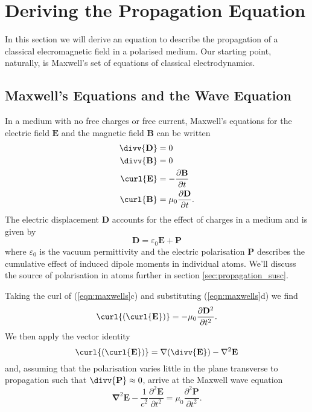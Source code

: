 \section{Deriving the Propagation Equation}
  \label{sec:propagation_deriving}

    In this section we will derive an equation to describe the propagation of a
    classical elecromagnetic field in a polarised medium. Our starting point,
    naturally, is Maxwell's set of equations of classical electrodynamics.

  \subsection{Maxwell's Equations and the Wave Equation}

    In a medium with no free charges or free current, Maxwell's equations for
    the electric field $\mathbf{E}$ and the magnetic field $\mathbf{B}$ can be
    written\cite{jackson1998classical}
    \begin{subequations}
      \begin{align}
        \divv{\mathbf{D}} &= 0 \\
        \divv{\mathbf{B}} &= 0 \\
        \curl{\mathbf{E}} &= -\frac{\partial \mathbf{B}}{\partial t} \\
        \curl{\mathbf{B}} &= \mu_0 \frac{\partial \mathbf{D}}{\partial t}.
      \end{align}
      \label{eqn:maxwells}
    \end{subequations}
    The electric displacement $\mathbf{D}$ accounts for the effect of charges in
    a medium and is given by 
    \begin{equation}\label{eqn:elec_displacement}
      \mathbf{D} = \varepsilon_0 \mathbf{E} + \mathbf{P}
    \end{equation}
    where $\varepsilon_0$ is the vacuum permittivity and the electric
    polarisation $\mathbf{P}$ describes the cumulative effect of induced dipole
    moments in individual atoms. We'll discuss the source of polarisation in
    atoms further in section \ref{sec:propagation_susc}.

    Taking the curl of (\ref{eqn:maxwells}c) and substituting 
    (\ref{eqn:maxwells}d) we find 
    $$
      \curl{(\curl{\mathbf{E}})} = 
      -\mu_0 \frac{\partial \mathbf{D}^2}{\partial t^2}.
    $$
    We then apply the vector identity
    $$
      \curl{(\curl{\mathbf{E}})} = 
        \nabla(\divv{\mathbf{E}}) - \nabla^2 \mathbf{E}
    $$
    and, assuming that the polarisation varies little in the plane transverse to
    propagation such that $\divv{\mathbf{P}} \approx 0$, arrive at the Maxwell
    wave equation
    \begin{equation}
      \mathbf{\nabla}^2 \mathbf{E} - \frac{1}{c^2} 
      \frac{\partial^2\mathbf{E}}{\partial t^2} = 
      \mu_0 \frac{\partial^2\mathbf{P}}{\partial t^2}.
    \label{eqn:mwe}
    \end{equation}

